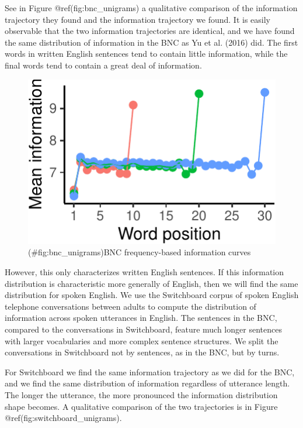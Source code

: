 \documentclass[man,floatsintext]{apa6}
\begin{document}
See in Figure @ref(fig:bnc\_unigrams) a qualitative comparison of the information trajectory they found and the information trajectory we found. It is easily observable that the two information trajectories are identical, and we have found the same distribution of information in the BNC as Yu et al. (2016) did. The first words in written English sentences tend to contain little information, while the final words tend to contain a great deal of information.

\begin{figure}
\centering
\includegraphics{figs/bnc_unigrams-1.pdf}
\caption{(\#fig:bnc\_unigrams)BNC frequency-based information curves}
\end{figure}

However, this only characterizes written English sentences. If this information distribution is characteristic more generally of English, then we will find the same distribution for spoken English. We use the Switchboard corpus of spoken English telephone conversations between adults to compute the distribution of information across spoken utterances in English. The sentences in the BNC, compared to the conversations in Switchboard, feature much longer sentences with larger vocabularies and more complex sentence structures. We split the conversations in Switchboard not by sentences, as in the BNC, but by turns.

For Switchboard we find the same information trajectory as we did for the BNC, and we find the same distribution of information regardless of utterance length. The longer the utterance, the more pronounced the information distribution shape becomes. A qualitative comparison of the two trajectories is in Figure @ref(fig:switchboard\_unigrams).
\end{document}
